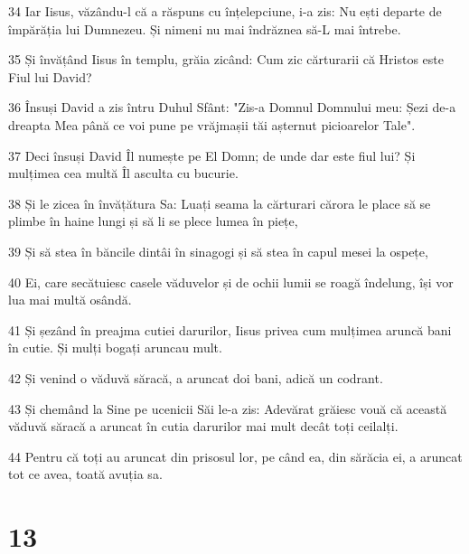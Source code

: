\par 34 Iar Iisus, văzându-l că a răspuns cu înțelepciune, i-a zis: Nu ești departe de împărăția lui Dumnezeu. Și nimeni nu mai îndrăznea să-L mai întrebe.
\par 35 Și învățând Iisus în templu, grăia zicând: Cum zic cărturarii că Hristos este Fiul lui David?
\par 36 Însuși David a zis întru Duhul Sfânt: "Zis-a Domnul Domnului meu: Șezi de-a dreapta Mea până ce voi pune pe vrăjmașii tăi așternut picioarelor Tale".
\par 37 Deci însuși David Îl numește pe El Domn; de unde dar este fiul lui? Și mulțimea cea multă Îl asculta cu bucurie.
\par 38 Și le zicea în învățătura Sa: Luați seama la cărturari cărora le place să se plimbe în haine lungi și să li se plece lumea în piețe,
\par 39 Și să stea în băncile dintâi în sinagogi și să stea în capul mesei la ospețe,
\par 40 Ei, care secătuiesc casele văduvelor și de ochii lumii se roagă îndelung, își vor lua mai multă osândă.
\par 41 Și șezând în preajma cutiei darurilor, Iisus privea cum mulțimea aruncă bani în cutie. Și mulți bogați aruncau mult.
\par 42 Și venind o văduvă săracă, a aruncat doi bani, adică un codrant.
\par 43 Și chemând la Sine pe ucenicii Săi le-a zis: Adevărat grăiesc vouă că această văduvă săracă a aruncat în cutia darurilor mai mult decât toți ceilalți.
\par 44 Pentru că toți au aruncat din prisosul lor, pe când ea, din sărăcia ei, a aruncat tot ce avea, toată avuția sa.

\chapter{13}


